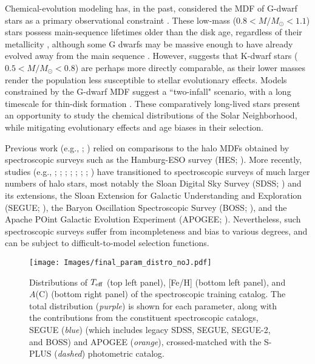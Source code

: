 \documentclass[twocolumn,trackchanges]{aastex63}
\begin{document}

Chemical-evolution modeling has, in the past, considered the MDF of G-dwarf stars as a primary observational constraint \citep[e.g.,][and references therein]{Caimmi:2008}. These low-mass ($0.8 < M/M_{\odot} < 1.1$) stars possess main-sequence lifetimes older than the disk age, regardless of their metallicity \citep{Bovy:2012}, although some G dwarfs may be massive enough to have already evolved away from the main sequence \citep{Kotoneva:2002}. However, \citet{Fenner:2003} suggests that K-dwarf stars ($0.5 < M/M_{\odot} < 0.8$) are perhaps more directly comparable, as their lower masses render the population less susceptible to stellar evolutionary effects. Models constrained by the G-dwarf MDF suggest a ``two-infall" scenario, with a long timescale for thin-disk formation \citep{Chiappini:2001}. These comparatively long-lived stars present an opportunity to study the chemical distributions of the Solar Neighborhood, while mitigating evolutionary effects and age biases in their selection.

Previous work (e.g., \citealt{Schorck:2009}; \citealt{Li:2010}) relied on comparisons to the halo MDFs obtained by spectroscopic surveys such as the Hamburg-ESO survey (HES; \citealt{Christlieb:2003}). More recently, studies (e.g., \citealt{Carollo:2007}; \citealt{Carollo:2010}; \citealt{Beers:2012}; \citealt{Lee:2017}; \citealt{Yoon:2018:AEGIS}; \citealt{Carollo:2019}; \citealt{Kim:2019}; \citealt{Lee:2019}) have transitioned to spectroscopic surveys of much larger numbers of halo stars, most notably the Sloan Digital Sky Survey (SDSS; \citealt{York:2000}) and its extensions, the Sloan Extension for Galactic Understanding and Exploration (SEGUE; \citealt{Yanny:2009}), the Baryon Oscillation Spectroscopic Survey (BOSS; \citealt{Dawson:2013}), and the Apache POint Galactic Evolution Experiment (APOGEE; \citealt{Majewski:2017}). Nevertheless, such spectroscopic surveys suffer from incompleteness and bias to various degrees, and can be subject to difficult-to-model selection functions.

\begin{figure*}
	\centering

	\texttt{[image: Images/final\_param\_distro\_noJ.pdf]}
	
	\caption{Distributions of $T_{\rm eff}$ (top left panel), [Fe/H] (bottom left panel), and $A$(C) (bottom right panel) of the spectroscopic training catalog. The total distribution (\textit{purple}) is shown for each parameter, along with the contributions from the constituent spectroscopic catalogs, SEGUE (\textit{blue}) (which includes legacy SDSS, SEGUE, SEGUE-2, and BOSS) and APOGEE (\textit{orange}), crossed-matched with the S-PLUS (\textit{dashed}) photometric catalog.
	\label{fig:catalog_distro}}
\end{figure*}
\end{document}
